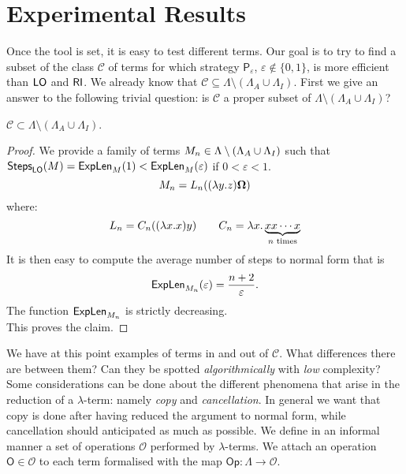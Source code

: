 \section{Experimental Results}
Once the tool is set, it is easy to test different terms. Our goal is to try to find a subset of the class $\mathcal{C}$ of terms for which strategy $\mathsf{P}_\varepsilon$, $\varepsilon\not\in\{0,1\}$, is more efficient than $\textsf{LO}$ and $\textsf{RI}$. We already know that $\mathcal{C}\subseteq\Lambda\setminus(\Lambda_A\cup\Lambda_I)$. First we give an answer to the following trivial question: is $\mathcal{C}$ a proper subset of $\Lambda\setminus(\Lambda_A\cup\Lambda_I)$?
\begin{proposition}\label{prop:strict}
	$\mathcal{C}\subset\Lambda\setminus(\Lambda_A\cup\Lambda_I)$.
\end{proposition}
\begin{proof}
	We provide a family of terms $M_n\in\Lambda\setminus(\Lambda_A\cup\Lambda_I)$ such that $\textsf{Steps}_{\textsf{LO}}(M)=\textsf{ExpLen}_{M}(1)<\textsf{ExpLen}_{M}(\varepsilon)$ if $0<\varepsilon<1$.
	$$
	M_n=L_n((\lambda y.z)\bm{\Omega})
	$$
	where:
	$$
	L_n = C_n((\lambda x.x)y)\qquad
	C_n = \lambda  x.\underbrace{xx\cdots x}_{n\text{ times}}
	$$
	It is then easy to compute the average number of steps to normal form that is
	$$
	\textsf{ExpLen}_{M_n}(\varepsilon)=\frac{n+2}{\varepsilon}.
	$$ 
	The function $\textsf{ExpLen}_{M_n}$ is strictly decreasing.\\
	This proves the claim.
\end{proof}
We have at this point examples of terms in and out of $\mathcal{C}$. What differences there are between them? Can they be spotted \emph{algorithmically} with \emph{low} complexity? Some considerations can be done about the different phenomena that arise in the reduction of a $\lambda$-term: namely \emph{copy} and \emph{cancellation}. In general we want that copy is done after having reduced the argument to normal form, while cancellation should anticipated as much as possible. We define in an informal manner a set of operations $\mathcal{O}$ performed by $\lambda$-terms. We attach an operation $\mathsf{O}\in\mathcal{O}$ to each term formalised with the map $\mathsf{Op}:\Lambda\rightarrow\mathcal{O}$.
